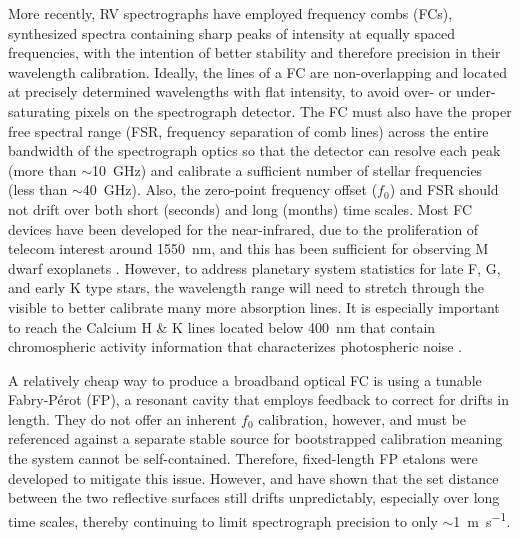More recently, RV spectrographs have employed frequency combs (FCs), synthesized spectra containing sharp peaks of intensity at equally spaced frequencies, with the intention of better stability and therefore precision in their wavelength calibration. Ideally, the lines of a FC are non-overlapping and located at precisely determined wavelengths with flat intensity, to avoid over- or under-saturating pixels on the spectrograph detector. The FC must also have the proper free spectral range (FSR, frequency separation of comb lines) across the entire bandwidth of the spectrograph optics so that the detector can resolve each peak (more than $\sim$\SI{10}{\giga\hertz}) and calibrate a sufficient number of stellar frequencies (less than $\sim$\SI{40}{\giga\hertz}). Also, the zero-point frequency offset ($f_0$) and FSR should not drift over both short (seconds) and long (months) time scales. Most FC devices have been developed for the near-infrared, due to the proliferation of telecom interest around \SI{1550}{\nano\meter}, and this has been sufficient for observing M dwarf exoplanets \citep{fischer_state_2016}. However, to address planetary system statistics for late F, G, and early K type stars, the wavelength range will need to stretch through the visible to better calibrate many more absorption lines. It is especially important to reach the Calcium H \& K lines located below \SI{400}{\nano\meter} that contain chromospheric activity information that characterizes photospheric noise \citep{isaacson_chromospheric_2010, lovis_harps_2011}.

A relatively cheap way to produce a broadband optical FC is using a tunable Fabry-P\'erot (FP), a resonant cavity that employs feedback to correct for drifts in length. They do not offer an inherent $f_0$ calibration, however, and must be referenced against a separate stable source for bootstrapped calibration \citep{mccracken_single-lock_2014, sturmer_rubidium-traced_2018} meaning the system cannot be self-contained. Therefore, fixed-length FP etalons were developed to mitigate this issue. However, \citet{reiners_laser-lock_2014} and \citet{wildi_passive_2012} have shown that the set distance between the two reflective surfaces still drifts unpredictably, especially over long time scales, thereby continuing to limit spectrograph precision to only $\sim$\SI{1}{\meter\per\second}.

